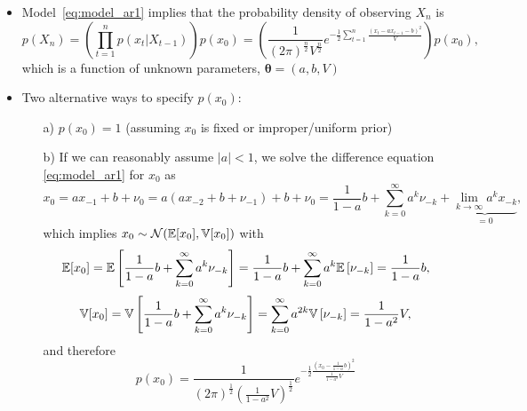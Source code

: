 \documentclass[12pt,a4paper]{article}
\begin{document}
\begin{itemize}
\begin{itemize}
  \item Model~\eqref{eq:model_ar1} implies that
    the probability density of observing $X_{n}$ is
    \begin{equation}\nonumber%
      p(X_{n})
      = \left(\prod_{t=1}^{n}p(x_{t}|X_{t-1})\right)p(x_{0})
      = \left(\frac{1}{(2\pi)^{\frac{n}{2}}V^{\frac{n}{2}}}e^{- \frac{1}{2}\sum_{t=1}^{n}\frac{(x_{t}-ax_{t-1}-b)^{2}}{V}}\right)p(x_{0}),
    \end{equation}
    which is a function of unknown parameters, $\bm{\theta} = (a, b, V)$
  \item Two alternative ways to specify $p(x_{0})$:
    \begin{itemize}
    \item[a)] $p(x_{0}) = 1$ (assuming $x_{0}$ is fixed or improper/uniform prior)
    \item[b)] If we can reasonably assume $|a|<1$,
      we solve the difference equation \eqref{eq:model_ar1} for $x_{0}$ as
      \begin{equation}\nonumber%
        x_{0}
        = ax_{-1} + b + \nu_{0}
        = a(ax_{-2} + b + \nu_{-1}) + b + \nu_{0}
        = \frac{1}{1-a}b + \sum_{k=0}^{\infty}a^{k}\nu_{-k} + \underbrace{\lim_{k\to\infty}a^{k}x_{-k}}_{=0},
      \end{equation}
      which implies $x_{0}\sim \mathcal{N}(\mathbb{E}[x_{0}],\mathbb{V}[x_{0}])$
      with
      \begin{equation}\nonumber%
        \E[x_{0}]
        = \E \left[\frac{1}{1-a}b + \sum_{k=0}^{\infty}a^{k}\nu_{-k}\right]
        = \frac{1}{1-a}b + \sum_{k=0}^{\infty}a^{k}\E \left[\nu_{-k}\right]
        = \frac{1}{1-a}b,
      \end{equation}
      \begin{equation}\nonumber%
        \V[x_{0}]
        = \V \left[\frac{1}{1-a}b + \sum_{k=0}^{\infty}a^{k}\nu_{-k}\right]
        = \sum_{k=0}^{\infty}a^{2k}\V \left[\nu_{-k}\right]
        = \frac{1}{1-a^{2}}V,
      \end{equation}
      and therefore
      \begin{equation}\nonumber%
        p(x_{0})
        = \frac{1}{(2\pi)^{\frac{1}{2}}\left(\frac{1}{1-a^{2}}V\right)^{\frac{1}{2}}}e^{- \frac{1}{2}\frac{\left(x_{0}- \frac{1}{1-a}b\right)^{2}}{\frac{1}{1-a^{2}}V}}
      \end{equation}
  \end{itemize}


\end{itemize}
\end{itemize}
\end{document}

